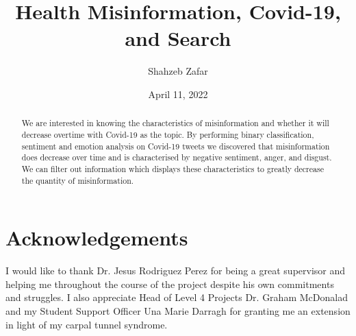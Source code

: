 \documentclass{l4proj}
\begin{document}
\title{Health Misinformation, Covid-19, and Search} %
\author{Shahzeb Zafar}
\date{April 11, 2022}

\maketitle

\begin{abstract}
    We are interested in knowing the characteristics of misinformation and whether it will decrease overtime with Covid-19 as the topic. By performing binary classification, sentiment and emotion analysis on Covid-19 tweets we discovered that misinformation does decrease over time and is characterised by negative sentiment, anger, and disgust. We can filter out information which displays these characteristics to greatly decrease the quantity of misinformation.
\end{abstract}

\chapter*{Acknowledgements}
%
%
I would like to thank Dr. Jesus Rodriguez Perez for being a great supervisor and helping me throughout the course of the project despite his own commitments and struggles. I also appreciate Head of Level 4 Projects Dr. Graham McDonalad and my Student Support Officer Una Marie Darragh for granting me an extension in light of my carpal tunnel syndrome.


%
%
\def\consentname {Shahzeb Zafar} %
\def\consentdate {11 April 2022} %
%
\educationalconsent
\end{document}
